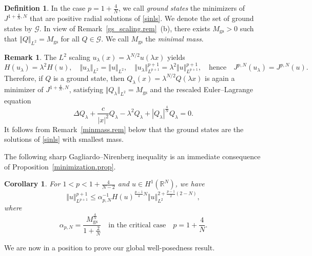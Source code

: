 \documentclass[reqno]{amsart}
\newcommand{\real}{\mathbb{R}}
\newcommand{\rn}{\real^N}
\let\le=\leqslant
\theoremstyle{plain}
\newtheorem{corollary}{Corollary}
\theoremstyle{definition}
\newtheorem{definition}{Definition}
\newtheorem{remark}{Remark}
\numberwithin{equation}{section}
\begin{document}
\begin{definition}\label{gs.def}
In the case $p=1+\frac{4}{N}$,
we call {\em ground states} the minimizers of $J^{1+\frac{4}{N},N}$ 
that are positive radial solutions of \eqref{sinls}. We denote the set of ground states by $\mathcal{G}$.
In view of Remark~\ref{gs_scaling.rem}~(b), there exists $M_\mathrm{gs}>0$ such that
$\Vert Q\Vert_{L^2}=M_\mathrm{gs}$ for all $Q\in\mathcal{G}$.
We call $M_\mathrm{gs}$ the {\em minimal mass}.
\end{definition}

\begin{remark}\label{scaling.rem}
The $L^2$ scaling $u_\lambda(x)=\lambda^{N/2}u(\lambda{x})$ yields
\[
H(u_\lambda)=\lambda^2H(u), \quad \Vert u_\lambda\Vert_{L^2}=\Vert u\Vert_{L^2},
\quad \Vert u_\lambda\Vert_{L^{p+1}}^{p+1}=\lambda^2 \Vert u\Vert_{L^{p+1}}^{p+1},
\quad \text{hence} \quad J^{p,N}(u_\lambda)=J^{p,N}(u).
\]
Therefore, if $Q$ is a ground state, then $Q_\lambda(x)=\lambda^{N/2}Q(\lambda x)$ 
is again a minimizer of $J^{1+\frac{4}{N},N}$, satisfying $\Vert Q_\lambda\Vert_{L^2}=M_\mathrm{gs}$ 
and the rescaled Euler--Lagrange equation
\[
\Delta Q_\lambda+ \frac{c}{|x|^2}Q_\lambda-\lambda^{2} Q_\lambda 
+ |Q_\lambda|^{\frac{4}{N}}Q_\lambda=0.
\]
It follows from Remark~\ref{minmass.rem} below that the
ground states are the solutions of \eqref{sinls} with smallest mass.
\end{remark}


The following sharp Gagliardo--Nirenberg inequality is an immediate consequence 
of Proposition~\ref{minimization.prop}.

\begin{corollary}\label{GN.cor} For $1<p<1+\frac{4}{N-2}$ and $u\in H^1(\rn)$, we have
\begin{equation}\label{GN}
\Vert u\Vert_{L^{p+1}}^{p+1} \le 
\alpha_{p,N}^{-1} H(u)^{\frac{p-1}{4}N} \Vert u\Vert_{L^{2}}^{2+\frac{p-1}{2}(2-N)},
\end{equation}
where
\[
\alpha_{p,N}=\frac{M_\mathrm{gs}^{\frac{4}{N}}}{1+\frac{2}{N}}
\quad\text{in the critical case} \quad p=1+\frac{4}{N}. 
\]
\end{corollary}

We are now in a position to prove our global well-posedness result.
\end{document}

